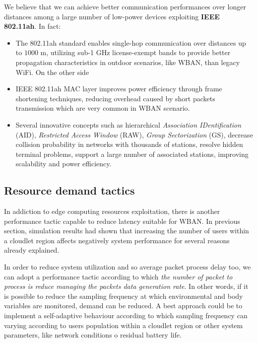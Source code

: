 \documentclass[sigchi]{acmart}
\begin{document}
We believe that we can achieve better communication performances over longer distances among a large number of low-power devices exploiting \textbf{IEEE 802.11ah}. In fact:

\begin{itemize}
\item The 802.11ah standard enables single-hop communication over distances up to $1000$ m, utilizing sub-1 GHz license-exempt bands to provide better propagation characteristics in outdoor scenarios, like WBAN, than legacy WiFi. On the other side

\item IEEE 802.11ah MAC layer improves power efficiency through frame shortening techniques, reducing overhead caused by short packets transmission which are very common in WBAN scenario.

\item Several innovative concepts such as hierarchical \textit{Association IDentification} (AID), \textit{Restricted Access Window} (RAW), \textit{Group Sectorization} (GS), decrease collision probability in networks with thousands of stations, resolve hidden terminal problems, support a large number of associated stations, improving scalability and power efficiency.

\end{itemize}

\subsection{Resource demand tactics}

In addiction to edge computing resources exploitation, there is another performance tactic capable to reduce latency suitable for WBAN. In previous section, \citet{MSAReport} simulation results had shown that increasing the number of users within a cloudlet region affects negatively system performance for several reasons already explained. 

In order to reduce system utilization and so average packet process delay too, we can adopt a performance tactic according to which \textit{the number of packet to process is reduce managing the packets data generation rate}. In other words, if it is possible to reduce the sampling frequency at which environmental and body variables are monitored, demand can be reduced. A best approach could be to implement a self-adaptive behaviour according to which sampling frequency can varying according to users population within a cloudlet region or other system parameters, like network conditions o residual battery life. 
\end{document}

